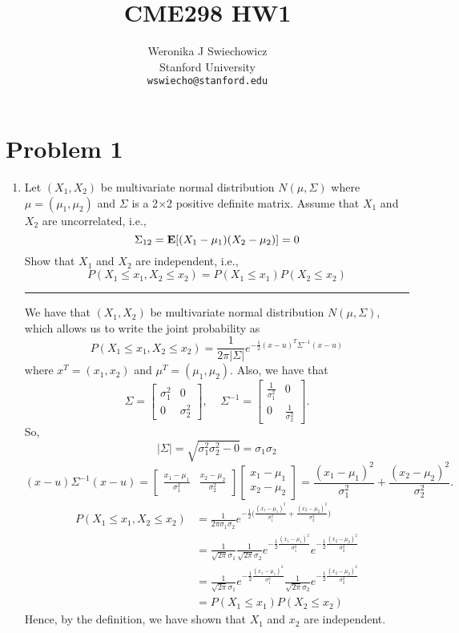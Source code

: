 \documentclass{article} %
\title{CME298 HW1}
\author{
Weronika J Swiechowicz\\
Stanford University\\
\texttt{wswiecho@stanford.edu} \\
}
\newcommand{\E}{{\mbox {\bf E}}}
\begin{document}
    \newcommand{\argmin}{\operatornamewithlimits{argmin}}
    \maketitle
    
    
    
 \section{Problem 1}
 \begin{enumerate}
 \item Let $(X_1, X_2)$ be multivariate normal distribution $N(\mu, \Sigma)$ where $\mu=(\mu_1, \mu_2)$ and $\Sigma$ is a 2$\times$2 positive definite matrix. Assume that $X_1$ and $X_2$ are uncorrelated, i.e., 
 \[  \Sigma_{12} = \E[(X_1-\mu_1)(X_2-\mu_2)] = 0\]
 Show that $X_1$ and $X_2$ are independent, i.e., 
 \[P(X_1\le x_1, X_2\le x_2) = P(X_1\le x_1)P(X_2\le x_2)\]
 
\rule{\textwidth}{1pt}
We have that $(X_1, X_2)$ be multivariate normal distribution $N(\mu, \Sigma)$, which allows us to write the joint probability as
 \[P(X_1\le x_1, X_2\le x_2) = \frac{1}{2\pi|\Sigma|}e^{-\frac{1}{2} (x-u)^T\Sigma^{-1}(x-u)  }    \]
where $x^T=(x_1, x_2)$ and $\mu^T=(\mu_1, \mu_2)$. Also, we have that 
\[\Sigma = \begin{bmatrix} \sigma_1^2 & 0 \\ 0 & \sigma_2^2 \end{bmatrix}, \ \ \ \ \  \Sigma^{-1} = \begin{bmatrix} \frac{1}{\sigma_1^2} & 0 \\ 0 & \frac{1}{\sigma_2^2} \end{bmatrix}. \]
So, 
\[ |\Sigma| = \sqrt{\sigma_1^2\sigma_2^2-0} = \sigma_1\sigma_2\]
\[ (x-u)\Sigma^{-1}(x-u) = \begin{bmatrix} \frac{x_1-\mu_1}{\sigma_1^2} & \frac{x_2-\mu_2}{\sigma_2^2} \end{bmatrix} \begin{bmatrix} x_1-\mu_1 \\ x_2-\mu_2 \end{bmatrix} = \frac{(x_1-\mu_1)^2}{\sigma_1^2} + \frac{(x_2-\mu_2)^2}{\sigma_2^2}.      \]
\begin{align*}
P(X_1\le x_1, X_2\le x_2) &= \frac{1}{2\pi\sigma_1\sigma_2}e^{-\frac{1}{2} \Big(\frac{(x_1-\mu_1)^2}{\sigma_1^2} + \frac{(x_2-\mu_2)^2}{\sigma_2^2}  \Big)  }  \\
&=  \frac{1}{\sqrt{2\pi}\sigma_1}\frac{1}{\sqrt{2\pi}\sigma_2} e^{-\frac{1}{2}\frac{(x_1-\mu_1)^2}{\sigma_1^2}} e^{-\frac{1}{2} \frac{(x_2-\mu_2)^2}{\sigma_2^2}  } \\
&=  \frac{1}{\sqrt{2\pi}\sigma_1}e^{-\frac{1}{2}\frac{(x_1-\mu_1)^2}{\sigma_1^2}} \frac{1}{\sqrt{2\pi}\sigma_2} e^{-\frac{1}{2} \frac{(x_2-\mu_2)^2}{\sigma_2^2}  } \\
&=P(X_1\le x_1)P(X_2\le x_2)
\end{align*}
Hence, by the definition, we have shown that $X_1$ and $x_2$ are independent.


\end{enumerate}
\end{document}

